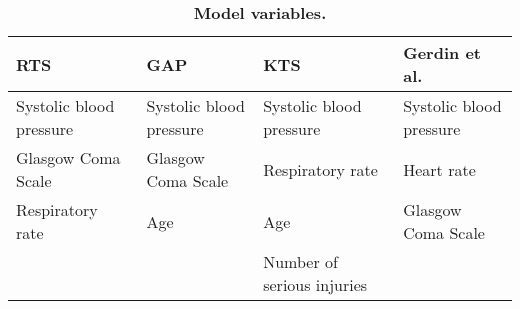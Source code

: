\begin{table}[!ht]
\centering
\caption{\bf Model variables.} 
\label{table:variables_table}
\begin{adjustbox}{max width = \linewidth} 
\begin{tabular} 
{llll}
  \toprule
RTS & GAP & KTS & Gerdin et al. \\ 
  \midrule
Systolic blood pressure & Systolic blood pressure & Systolic blood pressure & Systolic blood pressure \\ 
  Glasgow Coma Scale & Glasgow Coma Scale & Respiratory rate & Heart rate \\ 
  Respiratory rate & Age & Age & Glasgow Coma Scale \\ 
   &  & Number of serious injuries &  \\ 
   \bottomrule
\end{tabular} 
\end{adjustbox}
\end{table}

